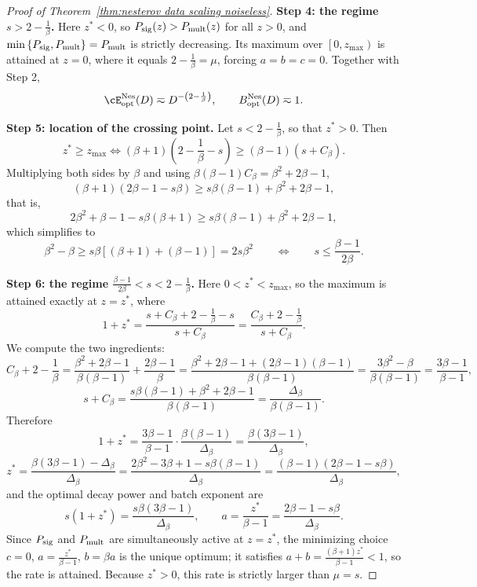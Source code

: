 \begin{proof}[Proof of Theorem~\ref{thm:nesterov data scaling noiseless}]
\textbf{Step 4: the regime \(s>2-\frac1\beta\).} Here \(z^{*}<0\), so \(P_{\rm sig}(z)>P_{\rm mult}(z)\) for all \(z>0\), and \(\min\left\{P_{\rm sig},P_{\rm mult}\right\}=P_{\rm mult}\) is strictly decreasing. Its maximum over \(\left[0,z_{\max}\right)\) is attained at \(z=0\), where it equals \(2-\frac1\beta=\mu\), forcing \(a=b=c=0\). Together with Step 2,
\[
    \cE_{\rm opt}^{\rm Nes}(D)\eqsim D^{-\left(2-\frac1\beta\right)},
    \qquad
    B_{\rm opt}^{\rm Nes}(D)\eqsim1 .
\]

\textbf{Step 5: location of the crossing point.} Let \(s<2-\frac1\beta\), so that \(z^{*}>0\). Then
\[
    z^{*}\geq z_{\max}
    \iff
    (\beta+1)\left(2-\frac1\beta-s\right)\geq(\beta-1)\left(s+C_{\beta}\right).
\]
Multiplying both sides by \(\beta\) and using \(\beta(\beta-1)C_{\beta}=\beta^{2}+2\beta-1\),
\[
    (\beta+1)\left(2\beta-1-s\beta\right)
    \geq
    s\beta(\beta-1)+\beta^{2}+2\beta-1 ,
\]
that is,
\[
    2\beta^{2}+\beta-1-s\beta(\beta+1)
    \geq
    s\beta(\beta-1)+\beta^{2}+2\beta-1 ,
\]
which simplifies to
\[
    \beta^{2}-\beta\geq s\beta\left[(\beta+1)+(\beta-1)\right]=2s\beta^{2}
    \qquad\Longleftrightarrow\qquad
    s\leq\frac{\beta-1}{2\beta}.
\]

\textbf{Step 6: the regime \(\frac{\beta-1}{2\beta}<s<2-\frac1\beta\).} Here \(0<z^{*}<z_{\max}\), so the maximum is attained exactly at \(z=z^{*}\), where
\[
    1+z^{*}
    =
    \frac{s+C_{\beta}+2-\frac1\beta-s}{s+C_{\beta}}
    =
    \frac{C_{\beta}+2-\frac1\beta}{s+C_{\beta}} .
\]
We compute the two ingredients:
\[
    C_{\beta}+2-\frac1\beta
    =
    \frac{\beta^{2}+2\beta-1}{\beta(\beta-1)}+\frac{2\beta-1}{\beta}
    =
    \frac{\beta^{2}+2\beta-1+(2\beta-1)(\beta-1)}{\beta(\beta-1)}
    =
    \frac{3\beta^{2}-\beta}{\beta(\beta-1)}
    =
    \frac{3\beta-1}{\beta-1},
\]
\[
    s+C_{\beta}
    =
    \frac{s\beta(\beta-1)+\beta^{2}+2\beta-1}{\beta(\beta-1)}
    =
    \frac{\Delta_{\beta}}{\beta(\beta-1)} .
\]
Therefore
\[
    1+z^{*}=\frac{3\beta-1}{\beta-1}\cdot\frac{\beta(\beta-1)}{\Delta_{\beta}}=\frac{\beta(3\beta-1)}{\Delta_{\beta}},
\]
\[
    z^{*}
    =
    \frac{\beta(3\beta-1)-\Delta_{\beta}}{\Delta_{\beta}}
    =
    \frac{2\beta^{2}-3\beta+1-s\beta(\beta-1)}{\Delta_{\beta}}
    =
    \frac{(\beta-1)\left(2\beta-1-s\beta\right)}{\Delta_{\beta}} ,
\]
and the optimal decay power and batch exponent are
\[
    s(1+z^{*})=\frac{s\beta(3\beta-1)}{\Delta_{\beta}},
    \qquad
    a=\frac{z^{*}}{\beta-1}=\frac{2\beta-1-s\beta}{\Delta_{\beta}} .
\]
Since \(P_{\rm sig}\) and \(P_{\rm mult}\) are simultaneously active at \(z=z^{*}\), the minimizing choice \(c=0\), \(a=\frac{z^{*}}{\beta-1}\), \(b=\beta a\) is the unique optimum; it satisfies \(a+b=\frac{(\beta+1)z^{*}}{\beta-1}<1\), so the rate is attained. Because \(z^{*}>0\), this rate is strictly larger than \(\mu=s\).


\end{proof}
